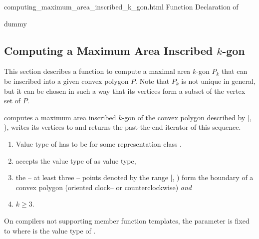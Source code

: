 \ccHtmlNoClassToc
\begin{ccHtmlClassFile}{computing_maximum_area_inscribed_k_gon.html}
  {Function Declaration of }
  \ccHtmlNoClassIndex\ccHtmlNoClassLinks
  \begin{ccClass}{dummy}
    \ccHtmlNoIndex\subsection{Computing a Maximum Area Inscribed $k$-gon}
  \label{secMaximumAreaInscribedKgon}
  \end{ccClass}
  
  This section describes a function to compute a maximal area $k$-gon
  $P_k$ that can be inscribed into a given convex polygon $P$. Note
  that $P_k$ is not unique in general, but it can be chosen in such a
  way that its vertices form a subset of the vertex set of $P$.


  \def\ccLongParamLayout{\ccTrue} 
  
  
  computes a maximum area inscribed $k$-gon of the convex polygon
  described by [, ), writes its
  vertices to  and returns the past-the-end iterator of this
  sequence.
  
  \begin{enumerate}
  \item Value type of  has to be
     for some representation class .
  \item {} accepts the value type of
     as value type,
  \item the -- at least three -- points denoted by the range
    [, ) form the boundary of a convex
    polygon (oriented clock-- or counterclockwise) \textit{and}
  \item $k \ge 3$.
  \end{enumerate}

  
  On compilers not supporting member function templates, the parameter
   is fixed to 
  where  is the value type of .
  

\end{ccHtmlClassFile}
